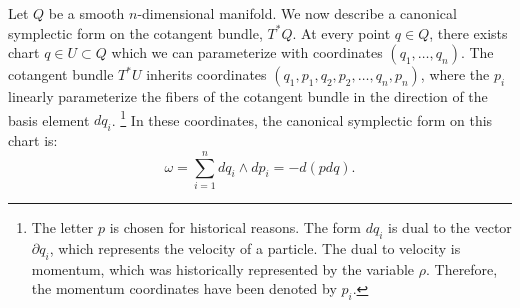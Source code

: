 

    Let $Q$ be a smooth $n$-dimensional manifold.
    We now describe a canonical symplectic form on the cotangent bundle, $T^*Q$.
    At every point $q\in Q$, there exists chart $q\in U\subset Q$ which we can parameterize with coordinates $(q_1, \ldots, q_n)$.
    The cotangent bundle $T^*U$ inherits coordinates $(q_1, p_1, q_2, p_2, \ldots, q_n, p_n)$, where the $p_i$ linearly parameterize the fibers of the cotangent bundle in the direction of the basis element $dq_i$.
    \footnote{ The letter $p$ is chosen for historical reasons. The form $dq_i$ is dual to the vector $\partial q_i$, which represents the velocity of a particle.     The dual to velocity is momentum, which was historically represented by the variable $\rho$.    Therefore, the momentum coordinates have been denoted by $p_i$.  } 
    In these coordinates, the canonical symplectic form on this chart is:
    \[\omega=\sum_{i=1}^n dq_i \wedge dp_i=-d(p dq).\]

